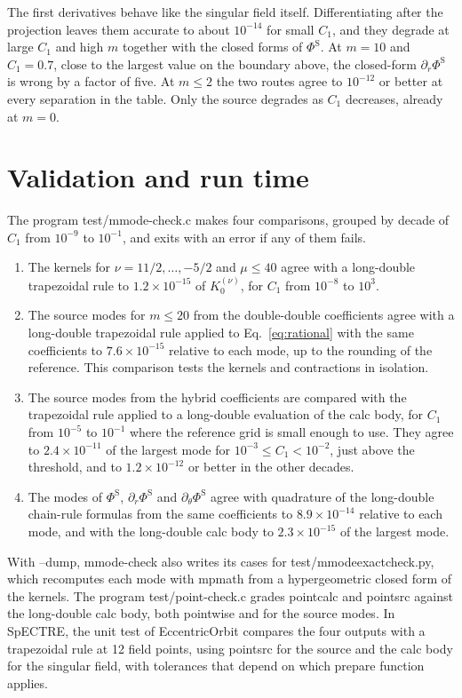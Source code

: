 \documentclass[11pt]{article}
\newcommand{\PhiS}{\Phi^{\mathrm{S}}}
\newcommand{\Kmn}[2]{K_{#1}^{(#2)}}
\newcommand{\codeus}{\textunderscore\allowbreak}
\newcommand{\codehy}{-\allowbreak}
\newcommand{\code}[1]{{\ttfamily\let\_\codeus\let\-\codehy #1}}
\begin{document}
The first derivatives behave like the singular field itself. Differentiating
after the projection leaves them accurate to about $10^{-14}$ for small $C_1$,
and they degrade at large $C_1$ and high $m$ together with the closed forms of
$\PhiS$. At $m=10$ and $C_1=0.7$, close to the largest value on the boundary
above, the closed-form $\partial_r\PhiS$ is wrong by a factor of five. At
$m\le2$ the two routes agree to $10^{-12}$ or better at every separation in the
table. Only the source degrades as $C_1$ decreases, already at $m=0$.

\section{Validation and run time}
\label{sec:validation}

The program \code{test/mmode-check.c} makes four comparisons, grouped by
decade of $C_1$ from $10^{-9}$ to $10^{-1}$, and exits with an error if any of
them fails.
\begin{enumerate}
  \item The kernels for $\nu=11/2,\dots,-5/2$ and $\mu\le40$ agree with a
    long-double trapezoidal rule to $1.2\times10^{-15}$ of $\Kmn{0}{\nu}$, for
    $C_1$ from $10^{-8}$ to $10^{3}$.
  \item The source modes for $m\le20$ from the double-double coefficients agree
    with a long-double trapezoidal rule applied to Eq.~\eqref{eq:rational} with
    the same coefficients to $7.6\times10^{-15}$ relative to each mode, up to the
    rounding of the reference. This comparison tests the kernels and
    contractions in isolation.
  \item The source modes from the hybrid coefficients are compared with the
    trapezoidal rule applied to a long-double evaluation of the calc body, for
    $C_1$ from $10^{-5}$ to $10^{-1}$ where the reference grid is small enough
    to use. They agree to $2.4\times10^{-11}$ of the largest mode for
    $10^{-3}\le C_1<10^{-2}$, just above the threshold, and to
    $1.2\times10^{-12}$ or better in the other decades.
  \item The modes of $\PhiS$, $\partial_r\PhiS$ and $\partial_\theta\PhiS$
    agree with quadrature of the long-double chain-rule formulas from the same
    coefficients to $8.9\times10^{-14}$ relative to each mode, and with the
    long-double calc body to $2.3\times10^{-15}$ of the largest mode.
\end{enumerate}
With \code{--dump}, \code{mmode-check} also writes its cases for
\code{test/mmode\_exact\_check.py}, which recomputes each mode with mpmath from
a hypergeometric closed form of the kernels. The program
\code{test/point-check.c} grades \code{point\_calc} and \code{point\_src}
against the long-double calc body, both pointwise and for the source modes. In
SpECTRE, the unit test of \code{EccentricOrbit} compares the four outputs with
a trapezoidal rule at 12 field points, using \code{point\_src} for the source
and the calc body for the singular field, with tolerances that depend on which
prepare function applies.
\end{document}
